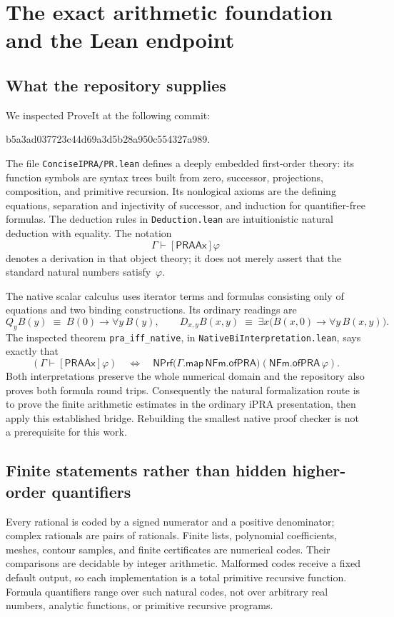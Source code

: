 \section{The exact arithmetic foundation and the Lean endpoint}
\label{sec:foundation-audit}

\subsection{What the repository supplies}
We inspected ProveIt at the following commit:
\begin{center}\small\ttfamily
b5a3ad037723c44d69a3d5b28a950c554327a989.
\end{center}
The file \texttt{ConciseIPRA/PR.lean} defines a deeply embedded first-order
theory: its function symbols are syntax trees built from zero, successor,
projections, composition, and primitive recursion. Its nonlogical axioms
are the defining equations, separation and injectivity of successor, and
induction for quantifier-free formulas. The deduction rules in
\texttt{Deduction.lean} are intuitionistic natural deduction with equality.
The notation
\[
       \Gamma\vdash[\mathsf{PRAAx}]\varphi
\]
denotes a derivation in that object theory; it does not merely assert that
the standard natural numbers satisfy~$\varphi$.

The native scalar calculus uses iterator terms and formulas consisting
only of equations and two binding constructions. Its ordinary readings are
\[
 Q_yB(y)\;\equiv\;B(0)\to\forall y\,B(y),\qquad
 D_{x,y}B(x,y)\;\equiv\;
     \exists x\bigl(B(x,0)\to\forall y\,B(x,y)\bigr).
\]
The inspected theorem \texttt{pra\_iff\_native}, in
\texttt{NativeBiInterpretation.lean}, says exactly that
\[
 (\Gamma\vdash[\mathsf{PRAAx}]\varphi)
 \quad\Longleftrightarrow\quad
 \mathsf{NPrf}\bigl(\Gamma.\mathsf{map}\,\mathsf{NFm.ofPRA}\bigr)
                   (\mathsf{NFm.ofPRA}\,\varphi).
\]
Both interpretations preserve the whole numerical domain and the
repository also proves both formula round trips. Consequently the natural
formalization route is to prove the finite arithmetic estimates in the
ordinary iPRA presentation, then apply this established bridge. Rebuilding
the smallest native proof checker is not a prerequisite for this work.

\subsection{Finite statements rather than hidden higher-order quantifiers}
Every rational is coded by a signed numerator and a positive denominator;
complex rationals are pairs of rationals. Finite lists, polynomial
coefficients, meshes, contour samples, and finite certificates are numerical
codes. Their comparisons are decidable by integer arithmetic. Malformed
codes receive a fixed default output, so each implementation is a total
primitive recursive function. Formula quantifiers range over such natural
codes, not over arbitrary real numbers, analytic functions, or primitive
recursive programs.

